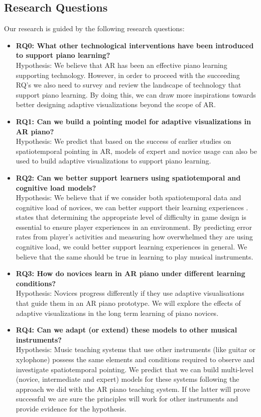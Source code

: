 \documentclass[manuscript,screen]{acmart}
\begin{document}
\subsection{Research Questions}
Our research is guided by the following research questions: 
\begin{itemize}
    \item \textbf{RQ0: What other technological interventions have been introduced to support piano learning?}\\
    Hypothesis: We believe that AR has been an effective piano learning supporting technology. However, in order to proceed with the succeeding RQ's we also need to survey and review the landscape of technology that support piano learning. By doing this, we can draw more inspirations towards better designing adaptive visualizations beyond the scope of AR. 
    \item \textbf{RQ1: Can we build a pointing model for adaptive visualizations in AR piano?} \\
    Hypothesis: We predict that based on the success of earlier studies on spatiotemporal pointing in AR, models of expert and novice usage can also be used to build adaptive visualizations to support piano learning. 
    \item \textbf{RQ2: Can we better support learners using spatiotemporal and cognitive load models?}\\
    Hypothesis: We believe that if we consider both spatiotemporal data and cognitive load of novices, we can better support their learning experiences \cite{rikers2004cognitive}.  \citet{lee2016website} states that determining the appropriate level of difficulty in game design is essential to ensure player experiences in an environment. By predicting error rates from player’s activities and measuring how overwhelmed they are using cognitive load, we could better support learning experiences in general. We believe that the same should be true in learning to play musical instruments.
    \item \textbf{RQ3: How do novices learn in AR piano under different learning conditions?}\\
    Hypothesis: Novices progress differently if they use adaptive visualisations that guide them in an AR piano prototype. We will explore the effects of adaptive visualizations in the long term learning of piano novices. 
    \item \textbf{RQ4: Can we adapt (or extend) these models to other musical instruments?}\\
    Hypothesis: Music teaching systems that use other instruments (like guitar or xylophone) possess the same elements and conditions required to observe and investigate spatiotemporal pointing. We predict that we can build multi-level (novice, intermediate and expert) models for these systems following the approach we did with the AR piano teaching system. If the latter will prove successful we are sure the principles will work for other instruments and provide evidence for the hypothesis. 
\end{itemize}
\end{document}
